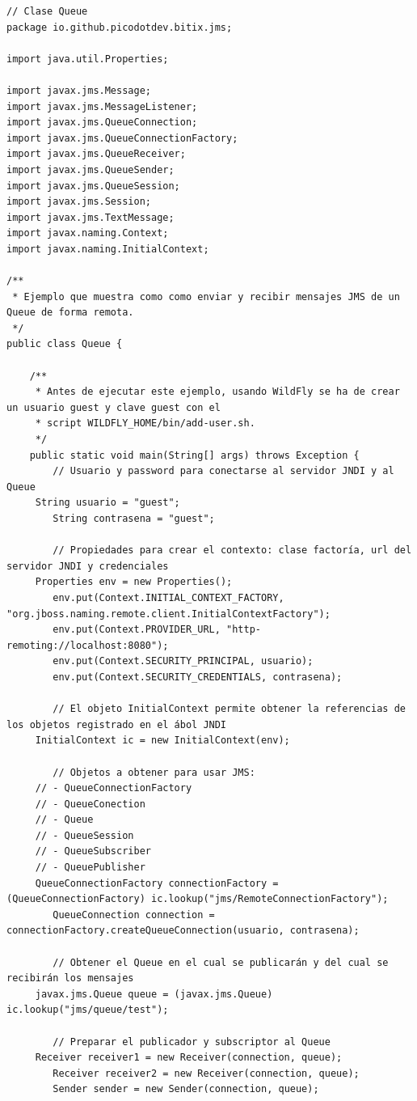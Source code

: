 \documentclass{article}
\begin{document}
\begin{lstlisting}[frame=single]
// Clase Queue
package io.github.picodotdev.bitix.jms;

import java.util.Properties;

import javax.jms.Message;
import javax.jms.MessageListener;
import javax.jms.QueueConnection;
import javax.jms.QueueConnectionFactory;
import javax.jms.QueueReceiver;
import javax.jms.QueueSender;
import javax.jms.QueueSession;
import javax.jms.Session;
import javax.jms.TextMessage;
import javax.naming.Context;
import javax.naming.InitialContext;

/**
 * Ejemplo que muestra como como enviar y recibir mensajes JMS de un Queue de forma remota.
 */
public class Queue {

    /**
     * Antes de ejecutar este ejemplo, usando WildFly se ha de crear un usuario guest y clave guest con el 
     * script WILDFLY_HOME/bin/add-user.sh.
     */
    public static void main(String[] args) throws Exception {
        // Usuario y password para conectarse al servidor JNDI y al Queue
     String usuario = "guest";
        String contrasena = "guest";

        // Propiedades para crear el contexto: clase factoría, url del servidor JNDI y credenciales
     Properties env = new Properties();
        env.put(Context.INITIAL_CONTEXT_FACTORY, "org.jboss.naming.remote.client.InitialContextFactory");
        env.put(Context.PROVIDER_URL, "http-remoting://localhost:8080");
        env.put(Context.SECURITY_PRINCIPAL, usuario);
        env.put(Context.SECURITY_CREDENTIALS, contrasena);

        // El objeto InitialContext permite obtener la referencias de los objetos registrado en el ábol JNDI
     InitialContext ic = new InitialContext(env);

        // Objetos a obtener para usar JMS: 
     // - QueueConnectionFactory
     // - QueueConection
     // - Queue
     // - QueueSession
     // - QueueSubscriber
     // - QueuePublisher
     QueueConnectionFactory connectionFactory = (QueueConnectionFactory) ic.lookup("jms/RemoteConnectionFactory");
        QueueConnection connection = connectionFactory.createQueueConnection(usuario, contrasena);
        
        // Obtener el Queue en el cual se publicarán y del cual se recibirán los mensajes
     javax.jms.Queue queue = (javax.jms.Queue) ic.lookup("jms/queue/test");

        // Preparar el publicador y subscriptor al Queue
     Receiver receiver1 = new Receiver(connection, queue);
        Receiver receiver2 = new Receiver(connection, queue);
        Sender sender = new Sender(connection, queue);
        

\end{lstlisting}
\end{document}
